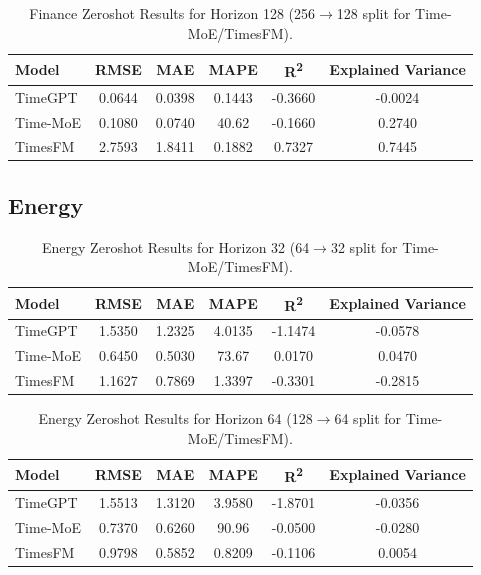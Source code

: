 \begin{table}[h!]
\centering
\begin{tabular}{lccccc}
\hline
Model      & RMSE   & MAE    & MAPE    & R\textsuperscript{2} & Explained Variance \\
\hline
TimeGPT    & 0.0644 & 0.0398 & 0.1443 & -0.3660 & -0.0024 \\
Time-MoE   & 0.1080 & 0.0740 & 40.62  & -0.1660 & 0.2740 \\
TimesFM    & 2.7593 & 1.8411 & 0.1882 & 0.7327  & 0.7445 \\
\hline
\end{tabular}
\caption{Finance Zeroshot Results for Horizon 128 (256$\to$128 split for Time-MoE/TimesFM).}
\label{tab:finance_h128}
\end{table}

\newpage
\subsection{Energy}

\begin{table}[h!]
\centering
\begin{tabular}{lccccc}
\hline
Model      & RMSE   & MAE    & MAPE    & R\textsuperscript{2} & Explained Variance \\
\hline
TimeGPT    & 1.5350 & 1.2325 & 4.0135  & -1.1474 & -0.0578 \\
Time-MoE   & 0.6450 & 0.5030 & 73.67   & 0.0170  & 0.0470 \\
TimesFM    & 1.1627 & 0.7869 & 1.3397  & -0.3301 & -0.2815 \\
\hline
\end{tabular}
\caption{Energy Zeroshot Results for Horizon 32 (64$\to$32 split for Time-MoE/TimesFM).}
\label{tab:energy_h32}
\end{table}

\begin{table}[h!]
\centering
\begin{tabular}{lccccc}
\hline
Model      & RMSE   & MAE    & MAPE    & R\textsuperscript{2} & Explained Variance \\
\hline
TimeGPT    & 1.5513 & 1.3120 & 3.9580  & -1.8701 & -0.0356 \\
Time-MoE   & 0.7370 & 0.6260 & 90.96   & -0.0500 & -0.0280 \\
TimesFM    & 0.9798 & 0.5852 & 0.8209  & -0.1106 & 0.0054 \\
\hline
\end{tabular}
\caption{Energy Zeroshot Results for Horizon 64 (128$\to$64 split for Time-MoE/TimesFM).}
\label{tab:energy_h64}
\end{table}

